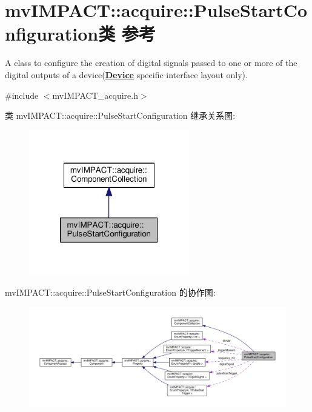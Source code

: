 \hypertarget{classmv_i_m_p_a_c_t_1_1acquire_1_1_pulse_start_configuration}{\section{mv\+I\+M\+P\+A\+C\+T\+:\+:acquire\+:\+:Pulse\+Start\+Configuration类 参考}
\label{classmv_i_m_p_a_c_t_1_1acquire_1_1_pulse_start_configuration}
}


A class to configure the creation of digital signals passed to one or more of the digital outputs of a device({\bfseries \hyperlink{classmv_i_m_p_a_c_t_1_1acquire_1_1_device}{Device}} specific interface layout only).  




{\ttfamily \#include $<$mv\+I\+M\+P\+A\+C\+T\+\_\+acquire.\+h$>$}



类 mv\+I\+M\+P\+A\+C\+T\+:\+:acquire\+:\+:Pulse\+Start\+Configuration 继承关系图\+:
\nopagebreak
\begin{figure}[H]
\begin{center}
\leavevmode
\includegraphics[width=198pt]{classmv_i_m_p_a_c_t_1_1acquire_1_1_pulse_start_configuration__inherit__graph}
\end{center}
\end{figure}


mv\+I\+M\+P\+A\+C\+T\+:\+:acquire\+:\+:Pulse\+Start\+Configuration 的协作图\+:
\nopagebreak
\begin{figure}[H]
\begin{center}
\leavevmode
\includegraphics[width=350pt]{classmv_i_m_p_a_c_t_1_1acquire_1_1_pulse_start_configuration__coll__graph}
\end{center}
\end{figure}
